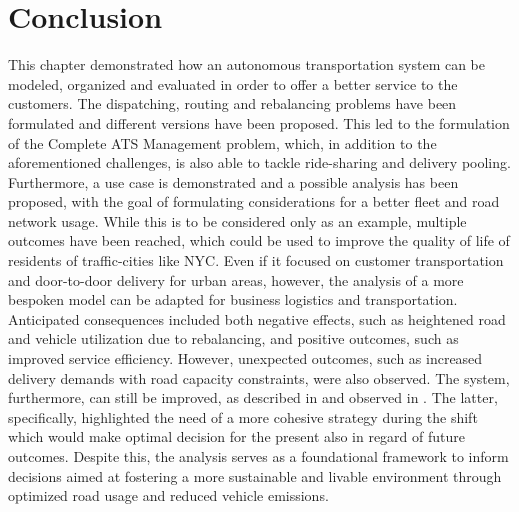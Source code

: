 \section{Conclusion}
This chapter demonstrated how an autonomous transportation system can be modeled, organized and evaluated in order to offer a better service to the customers. The dispatching, routing and rebalancing problems have been formulated and different versions have been proposed. This led to the formulation of the Complete ATS Management problem, which, in addition to the aforementioned challenges, is also able to tackle ride-sharing and delivery pooling. Furthermore, a use case is demonstrated and a possible analysis has been proposed, with the goal of formulating considerations for a better fleet and road network usage. While this is to be considered only as an example, multiple outcomes have been reached, which could be used to improve the quality of life of residents of traffic-cities like NYC. Even if it focused on customer transportation and door-to-door delivery for urban areas, however, the analysis of a more bespoken model can be adapted for business logistics and transportation. Anticipated consequences included both negative effects, such as heightened road and vehicle utilization due to rebalancing, and positive outcomes, such as improved service efficiency. However, unexpected outcomes, such as increased delivery demands with road capacity constraints, were also observed. The system, furthermore, can still be improved, as described in  and observed in . The latter, specifically, highlighted the need of a more cohesive strategy during the shift which would make optimal decision for the present also in regard of future outcomes. Despite this, the analysis serves as a foundational framework to inform decisions aimed at fostering a more sustainable and livable environment through optimized road usage and reduced vehicle emissions.









